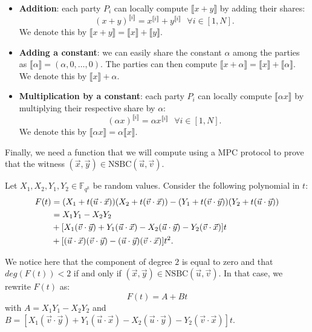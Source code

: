 \documentclass[english]{article}
\newcommand{\lir}{\llbracket i \rrbracket}
\begin{document}
		\begin{itemize}
			\item \textbf{Addition}: each party $P_i$ can locally compute $\llbracket x + y \rrbracket$ by adding their shares:
			$$
				(x + y)^{\lir} = x^{\lir} + y^{\lir} \text{ } \forall i \in [1, N].
			$$
			We denote this by $\llbracket x + y \rrbracket = \llbracket x \rrbracket + \llbracket y \rrbracket$.
			\item \textbf{Adding a constant}: we can easily share the constant $\alpha$ among the parties as $\llbracket \alpha \rrbracket = (\alpha, 0, \dots, 0)$.
			The parties can then compute $\llbracket x + \alpha \rrbracket = \llbracket x \rrbracket + \llbracket \alpha \rrbracket$. We denote this by $\llbracket x \rrbracket + \alpha$.
			\item \textbf{Multiplication by a constant}: each party $P_i$ can locally compute $\llbracket \alpha x \rrbracket$ by multiplying their respective share by $\alpha$:
			$$
				(\alpha x)^{\lir} = \alpha x^{\lir} \text{ } \forall i \in [1, N]. 
			$$
			We denote this by $\llbracket \alpha x \rrbracket = \alpha \llbracket x \rrbracket$.
		\end{itemize}
		
		Finally, we need a function that we will compute using a MPC protocol to prove that the witness $(\vec{x}, \vec{y}) \in \text{NSBC}(\vec{u}, \vec{v})$.
		
		Let $X_1, X_2, Y_1, Y_2 \in \mathbb{F}_{q^k}$ be random values. Consider the following polynomial in $t$:
		\begin{align}
			F(t) &= (X_1 + t(\vec{u} \cdot \vec{x})) (X_2 + t(\vec{v} \cdot \vec{x})) - (Y_1 	+ t(\vec{v} \cdot \vec{y})) (Y_2 + t(\vec{u} \cdot \vec{y})) \notag \\
			&= X_1Y_1 - X_2Y_2 \notag \\
			&+[X_1 (\vec{v} \cdot \vec{y}) + Y_1 (\vec{u} \cdot \vec{x}) - X_2 (\vec{u} \cdot \vec{y}) - Y_2 (\vec{v} \cdot \vec{x})]t \notag \\
			&+[(\vec{u} \cdot \vec{x}) (\vec{v} \cdot \vec{y}) - (\vec{u} \cdot \vec{y}) (\vec{v} \cdot \vec{x})]t^2. \notag
		\end{align}
		
		We notice here that the component of degree $2$ is equal to zero and that $deg(F(t)) < 2$ if and only if $(\vec{x}, \vec{y}) \in \text{NSBC}(\vec{u}, \vec{v})$. In that case, we rewrite $F(t)$ as:
		$$
			F(t) = A + Bt
		$$
		with $A = X_1Y_1 - X_2Y_2$ and $B = [X_1 (\vec{v} \cdot \vec{y}) + Y_1 (\vec{u} \cdot \vec{x}) - X_2 (\vec{u} \cdot \vec{y}) - Y_2 (\vec{v} \cdot \vec{x})]t$.
		
\end{document}
